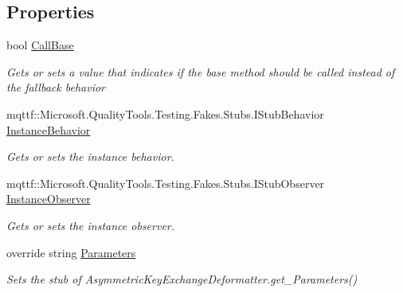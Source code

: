 \subsection*{Properties}
\begin{DoxyCompactItemize}
\item 
bool \hyperlink{class_system_1_1_security_1_1_cryptography_1_1_fakes_1_1_stub_asymmetric_key_exchange_deformatter_ae333027c90b2f9801e102af62917fcfe}{Call\-Base}
\begin{DoxyCompactList}\small\item\em Gets or sets a value that indicates if the base method should be called instead of the fallback behavior\end{DoxyCompactList}\item 
mqttf\-::\-Microsoft.\-Quality\-Tools.\-Testing.\-Fakes.\-Stubs.\-I\-Stub\-Behavior \hyperlink{class_system_1_1_security_1_1_cryptography_1_1_fakes_1_1_stub_asymmetric_key_exchange_deformatter_a866043a72e5d7f48b24840dc50d9bf8d}{Instance\-Behavior}
\begin{DoxyCompactList}\small\item\em Gets or sets the instance behavior.\end{DoxyCompactList}\item 
mqttf\-::\-Microsoft.\-Quality\-Tools.\-Testing.\-Fakes.\-Stubs.\-I\-Stub\-Observer \hyperlink{class_system_1_1_security_1_1_cryptography_1_1_fakes_1_1_stub_asymmetric_key_exchange_deformatter_a140d067e6e4149a58a02611a97c70f23}{Instance\-Observer}
\begin{DoxyCompactList}\small\item\em Gets or sets the instance observer.\end{DoxyCompactList}\item 
override string \hyperlink{class_system_1_1_security_1_1_cryptography_1_1_fakes_1_1_stub_asymmetric_key_exchange_deformatter_a91739c10b113fc583c84ba1855d26671}{Parameters}
\begin{DoxyCompactList}\small\item\em Sets the stub of Asymmetric\-Key\-Exchange\-Deformatter.\-get\-\_\-\-Parameters()\end{DoxyCompactList}\end{DoxyCompactItemize}


